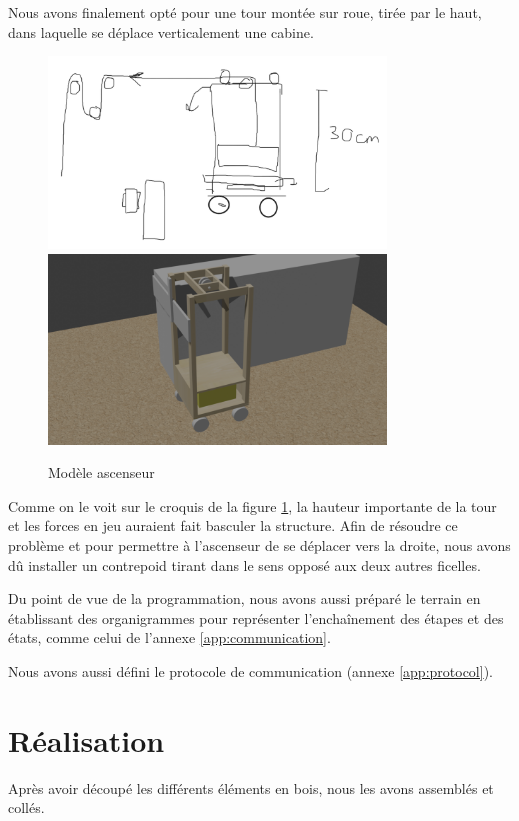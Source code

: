 Nous avons finalement opté pour une tour montée sur roue, tirée par le haut, dans laquelle se déplace verticalement une cabine.

\begin{figure}[H]
  \centering
  \includegraphics[width=0.8\textwidth]{croquis/contrepoid}
  \includegraphics[width=0.8\textwidth]{croquis/ascenseur_3d}
  \caption{Modèle ascenseur}
  \label{fig:ascenseur_3d}
\end{figure}

Comme on le voit sur le croquis de la figure \ref{fig:ascenseur_3d}, la hauteur importante de la tour et les forces en jeu auraient fait basculer la structure.
Afin de résoudre ce problème et pour permettre à l'ascenseur de se déplacer vers la droite, nous avons dû installer un contrepoid tirant dans le sens opposé aux deux autres ficelles.

Du point de vue de la programmation, nous avons aussi préparé le terrain en établissant des organigrammes pour représenter l'enchaînement des étapes et des états, comme celui de l'annexe \ref{app:communication}.

Nous avons aussi défini le protocole de communication (annexe \ref{app:protocol}).

\section{Réalisation}
Après avoir découpé les différents éléments en bois, nous les avons assemblés et collés.

